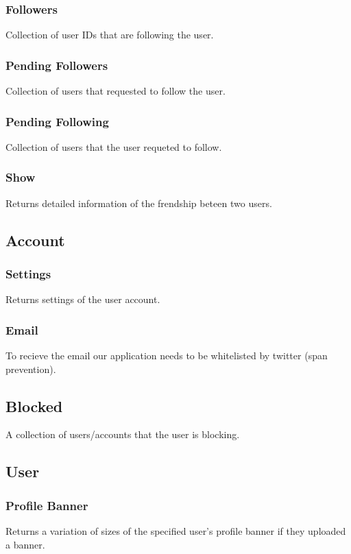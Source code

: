 \documentclass{article}
\begin{document}
		\subsubsection{Followers}
			Collection of user IDs that are following the user.

		\subsubsection{Pending Followers}
			Collection of users that requested to follow the user.

		\subsubsection{Pending Following}
			Collection of users that the user requeted to follow.

		\subsubsection{Show}
			Returns detailed information of the frendship beteen two users.

	\subsection{Account}
		\subsubsection{Settings}
			Returns settings of the user account.

		\subsubsection{Email}
			To recieve the email our application needs to be whitelisted by twitter (span prevention).

	\subsection{Blocked}
		A collection of users/accounts that the user is blocking.

	\subsection{User}
		\subsubsection{Profile Banner}
			Returns a variation of sizes of the specified user's profile banner if they uploaded a banner.
\end{document}

